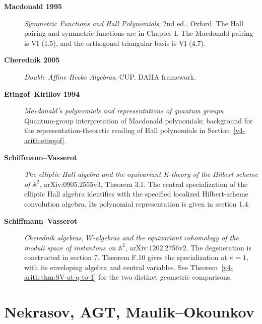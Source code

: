 \begin{description}
\item[\textbf{Macdonald 1995}] \emph{Symmetric Functions and Hall
Polynomials}, 2nd ed., Oxford. The Hall pairing and symmetric
functions are in Chapter I. The Macdonald pairing is VI (1.5),
and the orthogonal triangular basis is VI (4.7).
\item[\textbf{Cherednik 2005}] \emph{Double Affine Hecke Algebras},
CUP. DAHA framework.
\item[\textbf{Etingof--Kirillov 1994}] \emph{Macdonald's polynomials
and representations of quantum groups}. Quantum-group interpretation
of Macdonald polynomials; background for the representation-theoretic
reading of Hall polynomials in Section~\ref{v4-arith:etingof}.
\item[\textbf{Schiffmann--Vasserot}] \emph{The elliptic
Hall algebra and the equivariant K-theory of the Hilbert scheme of
\(\mathbb A^2\)}, arXiv:0905.2555v3, Theorem 3.1.
The central specialization of the elliptic Hall algebra identifies
with the specified localized Hilbert-scheme convolution algebra.
Its polynomial representation is given in section 1.4.
\item[\textbf{Schiffmann--Vasserot}] \emph{Cherednik algebras,
\(W\)-algebras and the equivariant cohomology of the moduli space
of instantons on \(\mathbb A^2\)}, arXiv:1202.2756v2.
The degeneration is constructed in section 7. Theorem F.10 gives
the specialization at \(\kappa=1\), with its enveloping algebra
and central variables. See Theorem~\ref{v4-arith:thm:SV-at-q-to-1}
for the two distinct geometric comparisons.
\end{description}

\section{Nekrasov, AGT, Maulik--Okounkov}
\label{v4-arith:app:A:nekrasov}

